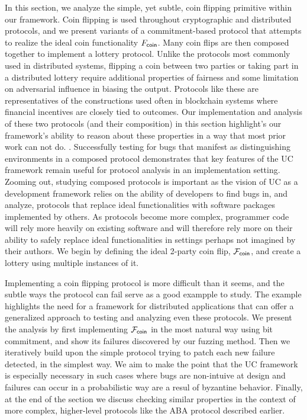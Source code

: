 In this section, we analyze the simple, yet subtle, coin flipping primitive
within our framework.  Coin flipping is used throughout cryptographic and
distributed protocols, and we present variants of a commitment-based protocol
that attempts to realize the ideal coin functionality $F_{{\mathsf {coin}}}$.  Many coin
flips are then composed together to implement a lottery protocol.  Unlike the
protocols most commonly used in distributed systems, flipping a coin between
two parties or taking part in a distributed lottery require additional
properties of fairness and some limitation on adversarial influence in biasing
the output. Protocols like these are representatives of the constructions used often 
in blockchain systems where financial incentives are closely tied to outcomes.
Our implementation and analysis of these two protocols (and their
composition) in this section highlight's our framework's ability to reason
about these properties in a way that most prior work can not do.  .  Successfully testing for bugs that manifest as distinguishing environments in a
composed protocol demonstrates that key features of the UC framework remain
useful for protocol analysis in an implementation setting.  Zooming out,
studying composed protocols is important as the vision of UC as a development
framework relies on the ability of developers to find bugs in, and analyze,
protocols that replace ideal functionalities with software packages implemented
by others.  As protocols become more complex, programmer code will rely more
heavily on existing software and will therefore rely more on their ability to
safely replace ideal functionalities in settings perhaps not imagined by their
authors.  We begin by defining the ideal 2-party coin flip, $\mathcal{F}_{{\mathsf {coin}}}$, and
create a lottery using multiple instances of it.

Implementing a coin flipping protocol is more difficult than it seems, and the
subtle ways the protocol can fail serve as a good exampple to study.  The
example highlights the need for a framework for distributed applications that
can offer a generalized approach to testing and analyzing even these
protocols.  We present the analysis by first implementing $\mathcal{F}_{{\mathsf {coin}}}$ in the
most natural way using bit commitment, and show its failures discovered by our
fuzzing method.  Then we iteratively build upon the simple protocol trying to
patch each new failure detected, in the simplest way. We aim to make the point
that the UC framework is especially necessary in such cases where bugs are
non-intuive at design and failures can occur in a probabilistic way are a resul
of byzantine behavior. Finally, at the end of the section we discuss checking similar
properties in the context of more complex, higher-level protocols like the ABA
protocol described earlier.

